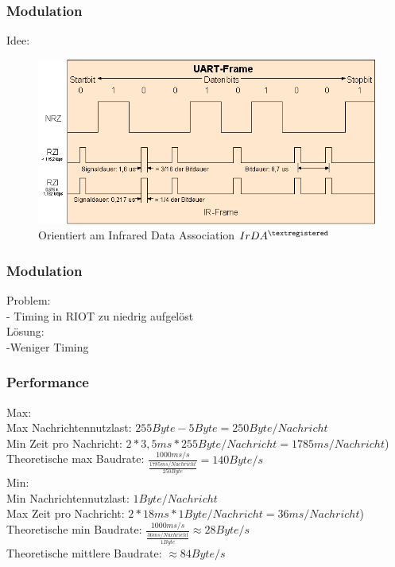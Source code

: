 \documentclass{beamer}
\begin{document}
	\begin{frame} %
		\frametitle{ Modulation } %
		{\LARGE Idee:}
		\break
		\begin{figure}
			\begin{center}
				\includegraphics[scale=0.5]{Medien/Modulation.PNG}\\
				Orientiert am Infrared Data Association $IrDA^{\textregistered}$
			\end{center}
		\end{figure}
	\end{frame}

	\begin{frame} %
		\frametitle{ Modulation } %
		{\LARGE Problem:}\\
		- Timing in RIOT zu niedrig aufgelöst\\
		\break
		{\LARGE Lösung:}\\
		-Weniger Timing\\

	\end{frame}

	\begin{frame} %
		\frametitle{ Performance } %
		{\Large Max:}\\
		Max Nachrichtennutzlast: $255 Byte - 5 Byte = 250 Byte/Nachricht$\\
		Min Zeit pro Nachricht: $2 * 3,5 ms * 255 Byte/Nachricht = 1785 ms/Nachricht$)\\
		Theoretische max Baudrate: $\frac{1000 ms/s}{\frac{1785 ms/Nachricht}{250 Byte}} = 140 Byte/s$\\
		{\Large Min:}\\
		Min Nachrichtennutzlast: $1 Byte/Nachricht$\\
		Max Zeit pro Nachricht: $2 * 18 ms * 1 Byte/Nachricht = 36 ms/Nachricht$)\\
		Theoretische min Baudrate: $\frac{1000 ms/s}{\frac{36 ms/Nachricht}{1 Byte}} \approx 28 Byte/s$\\

		Theoretische mittlere Baudrate: $\approx 84 Byte/s$

	\end{frame}
\end{document}
